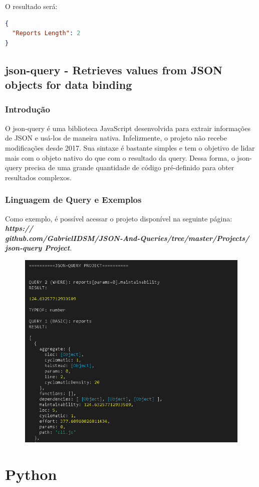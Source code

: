 \documentclass[a4paper, 12pt] {article}
\begin{document}
				O resultado será:
\begin{lstlisting}[language=json,firstnumber=1]
{
  "Reports Length": 2
}
\end{lstlisting}
		\newpage \subsection{json-query - Retrieves values from JSON objects for data binding}
			\subsubsection{Introdução}
				O json-query é uma biblioteca JavaScript desenvolvida para extrair informações de JSON e usá-los de maneira nativa. Infelizmente, o projeto não recebe modificações desde 2017. Sua sintaxe é bastante simples e tem o objetivo de lidar mais com o objeto nativo do que com o resultado da query. Dessa forma, o json-query precisa de uma grande quantidade de código pré-definido para obter resultados complexos.
			
			\subsubsection{Linguagem de Query e Exemplos}
				Como exemplo, é possível acessar o projeto disponível na seguinte página: \textbf{\textit{https://\\github.com/GabrielIDSM/JSON-And-Queries/tree/master/Projects/\\json-query Project}}.

				\begin{figure}[H]
					\centering
					\includegraphics[width=16cm]{json-query.png}
					\label{figure:Image}
				\end{figure}
	\newpage \section{Python}
\end{document}
